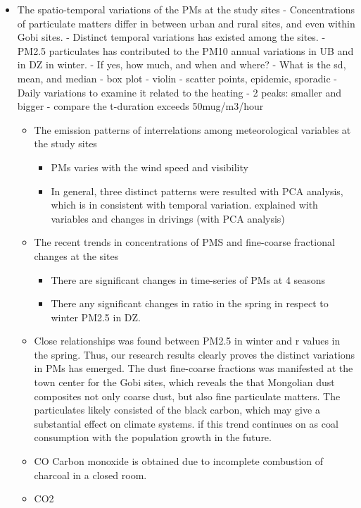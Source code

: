 \documentclass[
  11pt,
]{article}
\providecommand{\tightlist}{%
  \setlength{\itemsep}{0pt}\setlength{\parskip}{0pt}}
\begin{document}
\begin{itemize}
\tightlist
\item
  The spatio-temporal variations of the PMs at the study sites -
  Concentrations of particulate matters differ in between urban and
  rural sites, and even within Gobi sites. - Distinct temporal
  variations has existed among the sites. - PM2.5 particulates has
  contributed to the PM10 annual variations in UB and in DZ in winter. -
  If yes, how much, and when and where? - What is the sd, mean, and
  median - box plot - violin - scatter points, epidemic, sporadic -
  Daily variations to examine it related to the heating - 2 peaks:
  smaller and bigger - compare the t-duration exceeds 50mug/m3/hour

  \begin{itemize}
  \tightlist
  \item
    The emission patterns of interrelations among meteorological
    variables at the study sites

    \begin{itemize}
    \tightlist
    \item
      PMs varies with the wind speed and visibility
    \item
      In general, three distinct patterns were resulted with PCA
      analysis, which is in consistent with temporal variation.
      explained with variables and changes in drivings (with PCA
      analysis)
    \end{itemize}
  \item
    The recent trends in concentrations of PMS and fine-coarse
    fractional changes at the sites

    \begin{itemize}
    \tightlist
    \item
      There are significant changes in time-series of PMs at 4 seasons
    \item
      There any significant changes in ratio in the spring in respect to
      winter PM2.5 in DZ.
    \end{itemize}
  \item
    Close relationships was found between PM2.5 in winter and r values
    in the spring. Thus, our research results clearly proves the
    distinct variations in PMs has emerged. The dust fine-coarse
    fractions was manifested at the town center for the Gobi sites,
    which reveals the that Mongolian dust composites not only coarse
    dust, but also fine particulate matters. The particulates likely
    consisted of the black carbon, which may give a substantial effect
    on climate systems. if this trend continues on as coal consumption
    with the population growth in the future.
  \item
    CO Carbon monoxide is obtained due to incomplete combustion of
    charcoal in a closed room.
  \item
    CO2
  \end{itemize}
\end{itemize}
\end{document}
